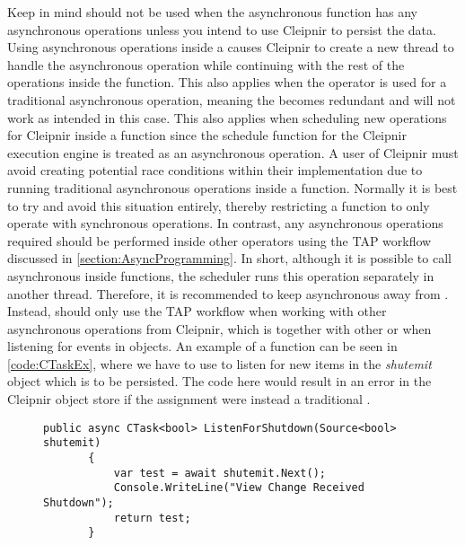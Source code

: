 Keep in mind  should not be used when the asynchronous function has any asynchronous operations unless you intend to use Cleipnir to persist the data. Using asynchronous operations inside a  causes Cleipnir to create a new thread to handle the asynchronous operation while continuing with the rest of the operations inside the function. This also applies when the  operator is used for a traditional asynchronous operation, meaning the  becomes redundant and will not work as intended in this case. This also applies when scheduling new operations for Cleipnir inside a  function since the schedule function for the Cleipnir execution engine is treated as an asynchronous operation. A user of Cleipnir must avoid creating potential race conditions within their implementation due to running traditional asynchronous operations inside a  function. Normally it is best to try and avoid this situation entirely, thereby restricting a  function to only operate with synchronous operations. In contrast, any asynchronous operations required should be performed inside other  operators using the TAP workflow discussed in \autoref{section:AsyncProgramming}. In short, although it is possible to call asynchronous  inside  functions, the scheduler runs this operation separately in another thread. Therefore, it is recommended to keep asynchronous  away from . Instead,  should only use the TAP workflow when working with other asynchronous operations from Cleipnir, which is together with other  or when listening for events in  objects. An example of a  function can be seen in \autoref{code:CTaskEx}, where we have to use  to listen for new items in the \emph{shutemit}  object which is to be persisted. The code here would result in an error in the Cleipnir object store if the  assignment were instead a traditional .

\begin{figure}[h]
	\centering
	\begin{lstlisting}[label = code:CTaskEx, caption= Example of a CTask function, captionpos = b, basicstyle=\scriptsize]
	public async CTask<bool> ListenForShutdown(Source<bool> shutemit)
       {
           var test = await shutemit.Next();
           Console.WriteLine("View Change Received Shutdown");
           return test;
       }
	\end{lstlisting}
\end{figure}

